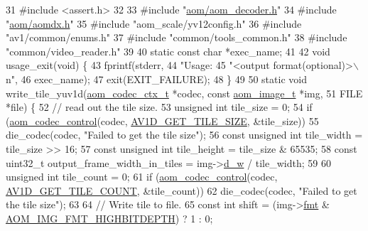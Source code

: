 \begin{DoxyCodeInclude}
31 \textcolor{preprocessor}{#include <assert.h>}
32 
33 \textcolor{preprocessor}{#include "\hyperlink{aom__decoder_8h}{aom/aom\_decoder.h}"}
34 \textcolor{preprocessor}{#include "\hyperlink{aomdx_8h}{aom/aomdx.h}"}
35 \textcolor{preprocessor}{#include "aom\_scale/yv12config.h"}
36 \textcolor{preprocessor}{#include "av1/common/enums.h"}
37 \textcolor{preprocessor}{#include "common/tools\_common.h"}
38 \textcolor{preprocessor}{#include "common/video\_reader.h"}
39 
40 \textcolor{keyword}{static} \textcolor{keyword}{const} \textcolor{keywordtype}{char} *exec\_name;
41 
42 \textcolor{keywordtype}{void} usage\_exit(\textcolor{keywordtype}{void}) \{
43   fprintf(stderr,
44           \textcolor{stringliteral}{"Usage: %
45           \textcolor{stringliteral}{"<output format(optional)>\(\backslash\)n"},
46           exec\_name);
47   exit(EXIT\_FAILURE);
48 \}
49 
50 \textcolor{keyword}{static} \textcolor{keywordtype}{void} write\_tile\_yuv1d(\hyperlink{structaom__codec__ctx}{aom\_codec\_ctx\_t} *codec, \textcolor{keyword}{const} 
      \hyperlink{structaom__image}{aom\_image\_t} *img,
51                              FILE *file) \{
52   \textcolor{comment}{// read out the tile size.}
53   \textcolor{keywordtype}{unsigned} \textcolor{keywordtype}{int} tile\_size = 0;
54   \textcolor{keywordflow}{if} (\hyperlink{group__codec_ga6da974f4eeaba1fa74106b28d0fe6ac5}{aom\_codec\_control}(codec, \hyperlink{group__aom__decoder_gga3865fd4b3192489baa9a5c3632ebe97ba4d9799d9e520785870b8d1f73a19c3c4}{AV1D\_GET\_TILE\_SIZE}, &tile\_size))
55     die\_codec(codec, \textcolor{stringliteral}{"Failed to get the tile size"});
56   \textcolor{keyword}{const} \textcolor{keywordtype}{unsigned} \textcolor{keywordtype}{int} tile\_width = tile\_size >> 16;
57   \textcolor{keyword}{const} \textcolor{keywordtype}{unsigned} \textcolor{keywordtype}{int} tile\_height = tile\_size & 65535;
58   \textcolor{keyword}{const} uint32\_t output\_frame\_width\_in\_tiles = img->\hyperlink{structaom__image_a89f80b1f58d608b9d2080635f4359034}{d\_w} / tile\_width;
59 
60   \textcolor{keywordtype}{unsigned} \textcolor{keywordtype}{int} tile\_count = 0;
61   \textcolor{keywordflow}{if} (\hyperlink{group__codec_ga6da974f4eeaba1fa74106b28d0fe6ac5}{aom\_codec\_control}(codec, \hyperlink{group__aom__decoder_gga3865fd4b3192489baa9a5c3632ebe97ba242d7dba47ef646f51f9795e2fa92f91}{AV1D\_GET\_TILE\_COUNT}, &tile\_count))
62     die\_codec(codec, \textcolor{stringliteral}{"Failed to get the tile size"});
63 
64   \textcolor{comment}{// Write tile to file.}
65   \textcolor{keyword}{const} \textcolor{keywordtype}{int} shift = (img->\hyperlink{structaom__image_a6c64b1ab918d80d52eb8f5d6d957e825}{fmt} & \hyperlink{aom__image_8h_a607b37d91f75442f54223ecd85f1b6cb}{AOM\_IMG\_FMT\_HIGHBITDEPTH}) ? 1 : 0;
}
\end{DoxyCodeInclude}
